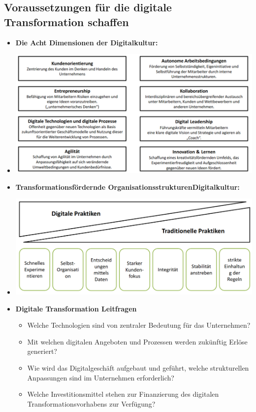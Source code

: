 \documentclass[12pt,a4paper]{article}
\begin{document}
\vspace{1cm}
\subsection{Voraussetzungen für die digitale Transformation schaffen} %
\begin{itemize}
   \item \textbf{Die Acht Dimensionen der Digitalkultur:}
   \item[] \includegraphics[scale=0.45]{8.png}
   
   \item \textbf{Transformationsfördernde OrganisationsstrukturenDigitalkultur:}
   \item[] \includegraphics[scale=0.3]{altneu.png}
   
   \item \textbf{Digitale Transformation Leitfragen}
         \begin{itemize}
            \item Welche Technologien sind von zentraler Bedeutung für das Unternehmen?
            \item Mit welchen digitalen Angeboten und Prozessen werden zukünftig Erlöse generiert?
            \item Wie wird das Digitalgeschäft aufgebaut und geführt, welche strukturellen Anpassungen sind im Unternehmen erforderlich?
            \item Welche Investitionsmittel stehen zur Finanzierung des digitalen Transformationsvorhabens zur Verfügung?
         \end{itemize}


\end{itemize}
\end{document}

